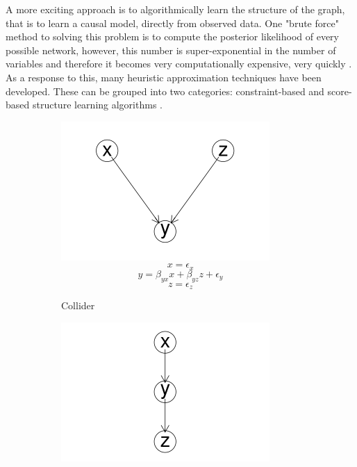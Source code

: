 \documentclass{article}
\begin{document}
A more exciting approach is to algorithmically learn the structure of the graph, that is to learn a causal model, directly from observed data. One "brute force" method to solving this problem is to compute the posterior likelihood of every possible network, however, this number is super-exponential in the number of variables and therefore it becomes very computationally expensive, very quickly \parencite{chickering1996learning}. As a response to this, many heuristic approximation techniques have been developed. These can be grouped into two categories: constraint-based and score-based structure learning algorithms \parencite{spirtes1991algorithm} \parencite{verma1991equivalence}. 

\begin{figure}
  \centering
  \begin{subfigure}{0.3\textwidth}
    \centering
    \includegraphics[width=\linewidth]{images/collider.png} 
    \small
    \begin{equation*}
      x = \epsilon_{x}
    \end{equation*}
    \begin{equation*}
      y = \beta_{yx} x + \beta_{yz} z + \epsilon_{y}
    \end{equation*}
    \begin{equation*}
      z = \epsilon_{z}
    \end{equation*}
    \caption{Collider}
    \label{collider}
  \end{subfigure}
  \begin{subfigure}{0.3\textwidth}
    \includegraphics[width=\linewidth]{images/chain.png}

\end{subfigure}
\end{figure}
\end{document}

